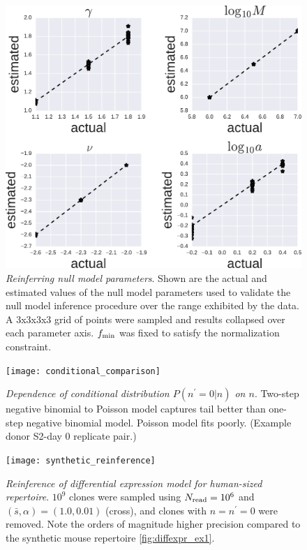 \documentclass[pre,twocolumn,english,longbibliography]{revtex4}
\newcommand{\beginsupplement}{
        \setcounter{table}{0}
        \renewcommand{\thetable}{S\arabic{table}}
        \setcounter{figure}{0}
        \renewcommand{\thefigure}{S\arabic{figure}}
     }
\newcommand{\<}{\langle}
\renewcommand{\>}{\rangle}
\begin{document}
\newpage

\beginsupplement


\begin{figure}
\includegraphics[width=\linewidth]{NB_Pois_nullpara_fits}
\centering{}
\caption{
\emph{Reinferring null model parameters}. Shown are the actual and estimated values of the null model parameters used to validate the null model inference procedure over the range exhibited by the data. A 3x3x3x3 grid of points were sampled and results collapsed over each parameter axis. $f_{\rm min}$ was fixed to satisfy the normalization constraint.
}
\label{fig:SM_reinfer_null}
\end{figure}

\begin{figure}
\texttt{[image: conditional\_comparison]}
\centering{}
\caption{
\emph{Dependence of conditional distribution $P(n^\prime=0|n)$ on $n$}. Two-step negative binomial to Poisson model captures tail better than one-step negative binomial model. Poisson model fits poorly. (Example donor S2-day 0 replicate pair.)\label{fig:SM_twostep_better}
}
\end{figure}

\begin{figure}
\texttt{[image: synthetic\_reinference]}
\centering{}
\caption{
\emph{Reinference of differential expression model for human-sized repertoire}. $10^9$ clones were sampled using $N_{\rm read}=10^6$ and $(\bar{s},\alpha)=(1.0,0.01)$ (cross), and clones with $n=n^\prime=0$ were removed. Note the orders of magnitude higher precision compared to the synthetic mouse repertoire \cref{fig:diffexpr_ex1}. 
\label{fig:SM_reinf_diffexpr}}
\end{figure}
\end{document}
